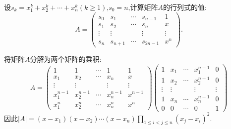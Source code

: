 \documentclass[../../main.tex]{subfiles}%
\begin{document}
\begin{example}
设\(s_k = x_1^k + x_2^k+\cdots + x_n^k(k\geqslant 1)\),\(s_0 = n\),计算矩阵\(A\)的行列式的值:
\[
A = 
\begin{pmatrix}
s_0 & s_1 & \cdots & s_{n - 1} & 1\\
s_1 & s_2 & \cdots & s_n & x\\
\vdots & \vdots & & \vdots & \vdots\\
s_n & s_{n + 1} & \cdots & s_{2n - 1} & x^n
\end{pmatrix}.
\]
\end{example}
\begin{solution}

将矩阵\(A\)分解为两个矩阵的乘积:
\[
A = 
\begin{pmatrix}
1 & 1 & \cdots & 1 & 1\\
x_1 & x_2 & \cdots & x_n & x\\
\vdots & \vdots & & \vdots & \vdots\\
x_1^{n - 1} & x_2^{n - 1} & \cdots & x_n^{n - 1} & x^{n - 1}\\
x_1^n & x_2^n & \cdots & x_n^n & x^n
\end{pmatrix}
\begin{pmatrix}
1 & x_1 & \cdots & x_1^{n - 1} & 0\\
1 & x_2 & \cdots & x_2^{n - 1} & 0\\
\vdots & \vdots & & \vdots & \vdots\\
1 & x_n & \cdots & x_n^{n - 1} & 0\\
0 & 0 & \cdots & 0 & 1
\end{pmatrix}
\]
因此\(|A|=(x - x_1)(x - x_2)\cdots(x - x_n)\prod_{1\leqslant  i < j\leqslant  n}(x_j - x_i)^2\).

\end{solution}
\end{document}
